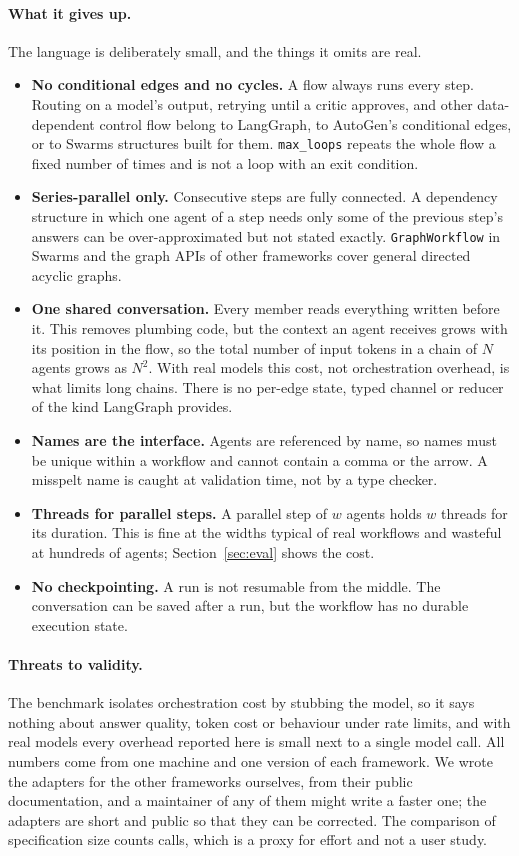 \documentclass[11pt]{article}
\newcommand{\code}[1]{\texttt{#1}}
\begin{document}
\paragraph{What it gives up.}
The language is deliberately small, and the things it omits are real.
\begin{itemize}
  \item \textbf{No conditional edges and no cycles.} A flow always runs every step. Routing on a model's output, retrying until a critic approves, and other data-dependent control flow belong to LangGraph, to AutoGen's conditional edges, or to Swarms structures built for them. \code{max\_loops} repeats the whole flow a fixed number of times and is not a loop with an exit condition.
  \item \textbf{Series-parallel only.} Consecutive steps are fully connected. A dependency structure in which one agent of a step needs only some of the previous step's answers can be over-approximated but not stated exactly. \code{GraphWorkflow} in Swarms and the graph APIs of other frameworks cover general directed acyclic graphs.
  \item \textbf{One shared conversation.} Every member reads everything written before it. This removes plumbing code, but the context an agent receives grows with its position in the flow, so the total number of input tokens in a chain of $N$ agents grows as $N^2$. With real models this cost, not orchestration overhead, is what limits long chains. There is no per-edge state, typed channel or reducer of the kind LangGraph provides.
  \item \textbf{Names are the interface.} Agents are referenced by name, so names must be unique within a workflow and cannot contain a comma or the arrow. A misspelt name is caught at validation time, not by a type checker.
  \item \textbf{Threads for parallel steps.} A parallel step of $w$ agents holds $w$ threads for its duration. This is fine at the widths typical of real workflows and wasteful at hundreds of agents; Section~\ref{sec:eval} shows the cost.
  \item \textbf{No checkpointing.} A run is not resumable from the middle. The conversation can be saved after a run, but the workflow has no durable execution state.
\end{itemize}

\paragraph{Threats to validity.}
The benchmark isolates orchestration cost by stubbing the model, so it says nothing about answer quality, token cost or behaviour under rate limits, and with real models every overhead reported here is small next to a single model call. All numbers come from one machine and one version of each framework. We wrote the adapters for the other frameworks ourselves, from their public documentation, and a maintainer of any of them might write a faster one; the adapters are short and public so that they can be corrected. The comparison of specification size counts calls, which is a proxy for effort and not a user study.
\end{document}
